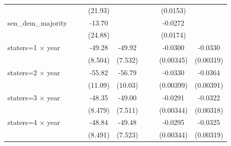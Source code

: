 {\begin{longtable}{l*{8}{c}}
                    &                     &                     &     (21.93)         &                     &                     &                     &    (0.0153)         &                     \\
[1em]
sen\_dem\_majority    &                     &                     &      -13.70         &                     &                     &                     &     -0.0272         &                     \\
                    &                     &                     &     (24.88)         &                     &                     &                     &    (0.0174)         &                     \\
[1em]
staters=1 $\times$ year&                     &                     &      -49.28\sym{***}&      -49.92\sym{***}&                     &                     &     -0.0300\sym{***}&     -0.0330\sym{***}\\
                    &                     &                     &     (8.504)         &     (7.532)         &                     &                     &   (0.00345)         &   (0.00319)         \\
[1em]
staters=2 $\times$ year&                     &                     &      -55.82\sym{***}&      -56.79\sym{***}&                     &                     &     -0.0330\sym{***}&     -0.0364\sym{***}\\
                    &                     &                     &     (11.09)         &     (10.03)         &                     &                     &   (0.00399)         &   (0.00391)         \\
[1em]
staters=3 $\times$ year&                     &                     &      -48.35\sym{***}&      -49.00\sym{***}&                     &                     &     -0.0291\sym{***}&     -0.0322\sym{***}\\
                    &                     &                     &     (8.479)         &     (7.511)         &                     &                     &   (0.00344)         &   (0.00318)         \\
[1em]
staters=4 $\times$ year&                     &                     &      -48.84\sym{***}&      -49.48\sym{***}&                     &                     &     -0.0295\sym{***}&     -0.0325\sym{***}\\
                    &                     &                     &     (8.491)         &     (7.523)         &                     &                     &   (0.00344)         &   (0.00319)         \\

\end{longtable}}
